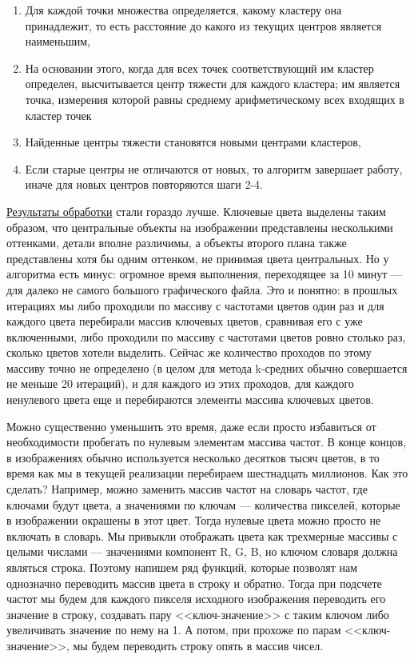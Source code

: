\documentclass[12pt]{article}
\begin{document}
{\begin{enumerate}
	\item Для каждой точки множества определяется, какому кластеру она принадлежит, то есть расстояние до какого из текущих центров является наименьшим,
	
	\item На основании этого, когда для всех точек соответствующий им кластер определен, высчитывается центр тяжести для каждого кластера; им является точка, измерения которой равны среднему арифметическому всех входящих в кластер точек
	
	\item Найденные центры тяжести становятся новыми центрами кластеров, 
	
	\item Если старые центры не отличаются от новых, то алгоритм завершает работу, иначе для новых центров повторяются шаги 2-4. 
	\end{enumerate}
	
	
	
	\hyperref[reduced_clasters_cats]{Результаты обработки} стали гораздо лучше. Ключевые цвета выделены таким образом, что центральные объекты на изображении представлены несколькими оттенками, детали вполне различимы, а объекты второго плана также представлены хотя бы одним оттенком, не принимая цвета центральных. Но у алгоритма есть минус: огромное время выполнения, переходящее за 10 минут --- для далеко не самого большого графического файла. Это и понятно: в прошлых итерациях мы либо проходили по массиву с частотами цветов один раз и для каждого цвета перебирали массив ключевых цветов, сравнивая его с уже включенными, либо проходили по массиву с частотами цветов ровно столько раз, сколько цветов хотели выделить. Сейчас же количество проходов по этому массиву точно не определено (в целом для метода k-средних обычно совершается не меньше 20 итераций), и для каждого из этих проходов, для каждого ненулевого цвета еще и перебираются элементы массива ключевых цветов.
	
	Можно существенно уменьшить это время, даже если просто избавиться от необходимости пробегать по нулевым элементам массива частот. В конце концов, в изображениях обычно используется несколько десятков тысяч цветов, в то время как мы в текущей реализации перебираем шестнадцать миллионов. Как это сделать? Например, можно заменить массив частот на словарь частот, где ключами будут цвета, а значениями по ключам --- количества пикселей, которые в изображении окрашены в этот цвет. Тогда нулевые цвета можно просто не включать в словарь. Мы привыкли отображать цвета как трехмерные массивы с целыми числами --- значениями компонент R, G, B, но ключом словаря должна являться строка. Поэтому напишем ряд функций, которые позволят нам однозначно переводить массив цвета в строку и обратно. Тогда при подсчете частот мы будем для каждого пикселя исходного изображения переводить его значение в строку, создавать пару <<ключ-значение>> с таким ключом либо увеличивать значение по нему на 1. А потом, при прохоже по парам <<ключ-значение>>, мы будем переводить строку опять в массив чисел.
	
}
\end{document}
